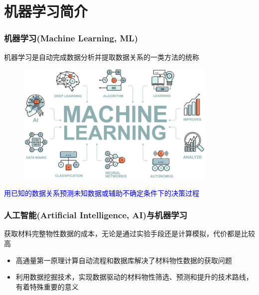 \section{机器学习简介}
\frame
{
	\frametitle{机器学习\textrm{(Machine Learning, ML)}}
机器学习是自动完成数据分析并提取数据关系的一类方法的统称
\begin{figure}[h!]
\centering
\vspace*{-0.1in}
\includegraphics[height=2.3in,width=3.8in,viewport=0 0 630 390,clip]{Figures/Machine_Learning.jpg}
\label{Machine-Learning}
\end{figure}
\textcolor{blue}{用已知的数据关系预测未知数据或辅助不确定条件下的决策过程}
}

\frame
{
	\frametitle{人工智能\textrm{(Artificial Intelligence, AI)}与机器学习}
		获取材料完整物性数据的成本，无论是通过实验手段还是计算模拟，代价都是比较高
		\begin{itemize}
			\item 高通量第一原理计算自动流程和数据库解决了材料物性数据的获取问题%
			\item 利用数据挖掘技术，实现数据驱动的材料物性筛选、预测和提升的技术路线，有着特殊重要的意义
		\end{itemize}
	\vskip 8pt
	{\fontsize{8.2pt}{6.2pt}}
}

